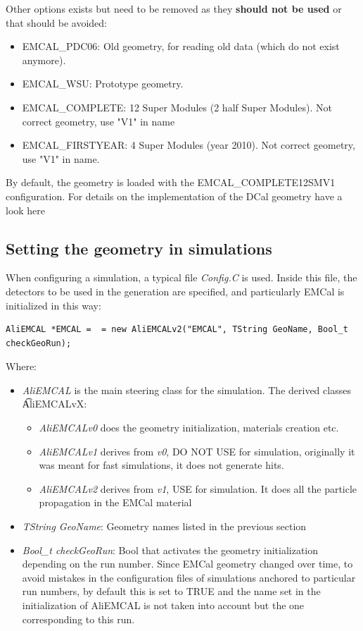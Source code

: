 Other options exists but need to be removed as they {\bf should not be used} or that should be avoided:
\begin{itemize}
\item EMCAL\_PDC06: Old geometry, for reading old data (which do not exist anymore).
\item EMCAL\_WSU: Prototype geometry. 
\item EMCAL\_COMPLETE: 12 Super Modules (2 half Super Modules). Not correct geometry, use "V1" in name
\item EMCAL\_FIRSTYEAR: 4 Super Modules (year 2010). Not correct geometry, use "V1" in name.
\end{itemize}

By default, the geometry is loaded with the EMCAL\_COMPLETE12SMV1 configuration. For details on the implementation of the DCal geometry have a look here~\cite{DCalGeoOff}
 
 \subsection{Setting the geometry in simulations}

When configuring a simulation, a typical file {\it Config.C} is used. Inside this file, the detectors to be used in the generation are specified, and particularly EMCal is initialized in this way:

\begin{lstlisting}
AliEMCAL *EMCAL =  = new AliEMCALv2("EMCAL", TString GeoName, Bool_t checkGeoRun);
\end{lstlisting}

Where:
\begin{itemize}
  \item {\it AliEMCAL} is the main steering class for the simulation. The derived classes {\t AliEMCALvX}:
    \begin{itemize}
    \item {\it AliEMCALv0} does the geometry initialization, materials creation etc.
    \item {\it AliEMCALv1} derives from {\it v0}, DO NOT USE for simulation, originally it was meant for fast simulations, it does not generate hits.
    \item {\it AliEMCALv2} derives from {\it v1}, USE for simulation. It does all the particle propagation in the EMCal material
\end{itemize}
  \item {\it TString GeoName}: Geometry names listed in the previous section
  \item {\it Bool\_t checkGeoRun}: Bool that activates the geometry initialization depending on the run number. Since EMCal geometry changed over time, to avoid mistakes in the configuration files of simulations anchored to particular run numbers,  by default this is set to TRUE and the name set in the initialization of AliEMCAL is not taken into account but the one corresponding to this run.
\end{itemize}

